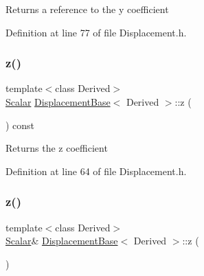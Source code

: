 \begin{DoxyReturn}{Returns}
a reference to the {\ttfamily y} coefficient 
\end{DoxyReturn}


Definition at line 77 of file Displacement.\+h.

\hypertarget{class_displacement_base_ac0d87fc13d3610e764501cd857178a9f}{}\label{class_displacement_base_ac0d87fc13d3610e764501cd857178a9f} 
\subsubsection{\texorpdfstring{z()}{z()}\hspace{0.1cm}{\footnotesize\ttfamily [1/2]}}
{\footnotesize\ttfamily template$<$class Derived$>$ \\
\hyperlink{class_displacement_base_a978caf313131fd9d221a856a2e4a80ad}{Scalar} \hyperlink{class_displacement_base}{Displacement\+Base}$<$ Derived $>$\+::z (\begin{DoxyParamCaption}{ }\end{DoxyParamCaption}) const\hspace{0.3cm}{\ttfamily [inline]}}

\begin{DoxyReturn}{Returns}
the {\ttfamily z} coefficient 
\end{DoxyReturn}


Definition at line 64 of file Displacement.\+h.

\hypertarget{class_displacement_base_af542c09c615b88965d96397c546fcf16}{}\label{class_displacement_base_af542c09c615b88965d96397c546fcf16} 
\subsubsection{\texorpdfstring{z()}{z()}\hspace{0.1cm}{\footnotesize\ttfamily [2/2]}}
{\footnotesize\ttfamily template$<$class Derived$>$ \\
\hyperlink{class_displacement_base_a978caf313131fd9d221a856a2e4a80ad}{Scalar}\& \hyperlink{class_displacement_base}{Displacement\+Base}$<$ Derived $>$\+::z (\begin{DoxyParamCaption}{ }\end{DoxyParamCaption})\hspace{0.3cm}{\ttfamily [inline]}}

